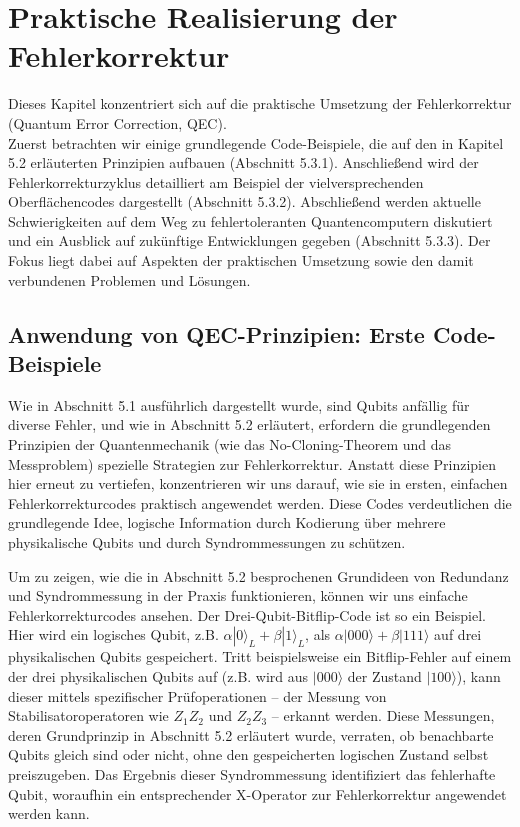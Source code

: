 \section{Praktische Realisierung der Fehlerkorrektur}\label{chap:QEC3}

Dieses Kapitel konzentriert sich auf die praktische Umsetzung der Fehlerkorrektur (Quantum Error Correction, QEC).\\
Zuerst betrachten wir einige grundlegende Code-Beispiele, die auf den in Kapitel 5.2 erläuterten Prinzipien aufbauen (Abschnitt 5.3.1). Anschließend wird der Fehlerkorrekturzyklus detailliert am Beispiel der vielversprechenden Oberflächencodes dargestellt (Abschnitt 5.3.2). Abschließend werden aktuelle Schwierigkeiten auf dem Weg zu fehlertoleranten Quantencomputern diskutiert und ein Ausblick auf zukünftige Entwicklungen gegeben (Abschnitt 5.3.3). Der Fokus liegt dabei auf Aspekten der praktischen Umsetzung sowie den damit verbundenen Problemen und Lösungen.

\subsection{Anwendung von QEC-Prinzipien: Erste Code-Beispiele}

Wie in Abschnitt 5.1 ausführlich dargestellt wurde, sind Qubits anfällig für diverse Fehler, und wie in Abschnitt 5.2 erläutert, erfordern die grundlegenden Prinzipien der Quantenmechanik (wie das No-Cloning-Theorem und das Messproblem) spezielle Strategien zur Fehlerkorrektur. Anstatt diese Prinzipien hier erneut zu vertiefen, konzentrieren wir uns darauf, wie sie in ersten, einfachen Fehlerkorrekturcodes praktisch angewendet werden. Diese Codes verdeutlichen die grundlegende Idee, logische Information durch Kodierung über mehrere physikalische Qubits und durch Syndrommessungen zu schützen.

Um zu zeigen, wie die in Abschnitt 5.2 besprochenen Grundideen von Redundanz und Syndrommessung in der Praxis funktionieren, können wir uns einfache Fehlerkorrekturcodes ansehen. Der Drei-Qubit-Bitflip-Code ist so ein Beispiel. Hier wird ein logisches Qubit, z.B. $\alpha|0\rangle_L + \beta|1\rangle_L$, als $\alpha|000\rangle+\beta|111\rangle$ auf drei physikalischen Qubits gespeichert. Tritt beispielsweise ein Bitflip-Fehler auf einem der drei physikalischen Qubits auf (z.B. wird aus $|000\rangle$ der Zustand $|100\rangle$), kann dieser mittels spezifischer Prüfoperationen – der Messung von Stabilisatoroperatoren wie $Z_1Z_2$ und $Z_2Z_3$ – erkannt werden. Diese Messungen, deren Grundprinzip in Abschnitt 5.2 erläutert wurde, verraten, ob benachbarte Qubits gleich sind oder nicht, ohne den gespeicherten logischen Zustand selbst preiszugeben. Das Ergebnis dieser Syndrommessung identifiziert das fehlerhafte Qubit, woraufhin ein entsprechender X-Operator zur Fehlerkorrektur angewendet werden kann.\cite[Seite 427-430]{nielsen_quantum_2010}\\

